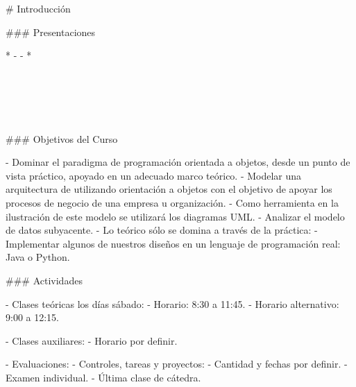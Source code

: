 # Introducción

### Presentaciones

* 
    - 
    - 
    \pause
* 
    \pause

    \vspace{-6mm}
    \begin{center}
    \hspace{20mm}\begin{customRoundedBox}{}
    \centering
        \\
        \vspace{4mm}
        \\
    \end{customRoundedBox}
    
    \hspace{60mm}\begin{customRoundedBox}{}
    \centering
        \\
    \end{customRoundedBox}
    \end{center}

### Objetivos del Curso

- Dominar el paradigma de programación orientada a objetos, desde un punto de vista 
  práctico, apoyado en un adecuado marco teórico.
  \pause
- Modelar una arquitectura de  utilizando orientación a objetos
  con el objetivo de apoyar los procesos de negocio
  de una empresa u organización.
  \pause
- Como herramienta en la ilustración de este modelo se utilizará los diagramas UML.
  \pause
- Analizar el modelo de datos subyacente.
  \pause
- Lo teórico sólo se domina a través de la práctica: 
    - Implementar algunos de nuestros diseños en un lenguaje de programación real: Java o Python.

### Actividades

- Clases teóricas los días sábado:
    - Horario: 8:30 a 11:45.
    - Horario alternativo: 9:00 a 12:15.

- Clases auxiliares:
    - Horario por definir.

- Evaluaciones:
    - Controles, tareas y proyectos:
        - Cantidad y fechas por definir.
    - Examen individual.
        - Última clase de cátedra.


